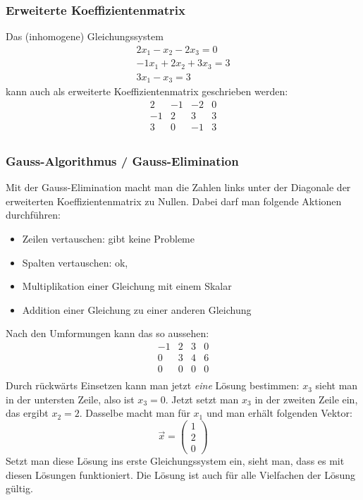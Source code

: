 \subsubsection{Erweiterte Koeffizientenmatrix}
Das (inhomogene) Gleichungssystem
\begin{align}
   2x_1 - x_2 - 2x_3 = 0 \\
   -1x_1 + 2x_2 + 3x_3 = 3 \\
   3x_1 - x_3 = 3
\end{align}
kann auch als erweiterte Koeffizientenmatrix geschrieben werden:
\[ \begin{array}{rrr|r}
2   &   -1    & -2    & 0   \\
-1  &   2     & 3     & 3   \\
3   &   0     & -1    & 3   \\
\end {array} \]

\subsubsection{Gauss-Algorithmus / Gauss-Elimination}
Mit der Gauss-Elimination macht man die Zahlen links unter der Diagonale
der erweiterten Koeffizientenmatrix zu Nullen. Dabei darf man folgende
Aktionen durchführen:
\begin{itemize}
  \item Zeilen vertauschen: gibt keine Probleme
  \item Spalten vertauschen: ok, 
  \item Multiplikation einer Gleichung mit einem Skalar
  \item Addition einer Gleichung zu einer anderen Gleichung
\end{itemize}
Nach den Umformungen kann das so aussehen:
\[ \begin{array}{rrr|r}
  -1 & 2  & 3  & 0 \\
  0 & 3  & 4  & 6 \\
  0 & 0  & 0  & 0 \\
\end {array} \]
Durch rückwärts Einsetzen kann man jetzt \emph{eine} Lösung bestimmen:
$x_3$ sieht man in der untersten Zeile, also ist $x_3 = 0$. Jetzt setzt
man $x_3$ in der zweiten Zeile ein, das ergibt $x_2 = 2$. Dasselbe macht
man für $x_1$ und man erhält folgenden Vektor:
\[ \vec x = \left( \begin{array} {c} 1 \\ 2 \\  0 \end{array} \right) \]
Setzt man diese Lösung ins erste Gleichungssystem ein, sieht man, dass
es mit diesen Lösungen funktioniert. Die Lösung ist auch für alle
Vielfachen der Lösung gültig.

